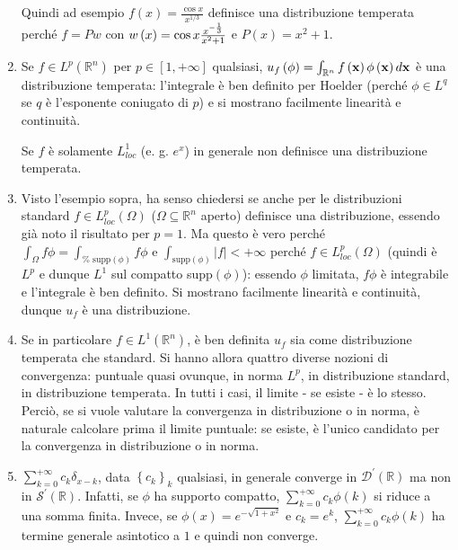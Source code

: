 \documentclass{article}
\begin{document}
\begin{enumerate}
Quindi ad esempio $f\left( x\right) =\frac{\cos x}{x^{1/3}}$ definisce una
distribuzione temperata perch\'{e} $f=Pw$ con $w\left( x\right) =\cos x\frac{%
x^{-\frac{1}{3}}}{x^{2}+1}$ e $P\left( x\right) =x^{2}+1$.

\item Se $f\in L^{p}\left( 
\mathbb{R}
^{n}\right) $ per $p\in \left[ 1,+\infty \right] $ qualsiasi, $u_{f}\left(
\phi \right) =\int_{%
\mathbb{R}
^{n}}f\left( \mathbf{x}\right) \phi \left( \mathbf{x}\right) d\mathbf{x}$ 
\`{e} una distribuzione temperata: l'integrale \`{e} ben definito per
Hoelder (perch\'{e} $\phi \in L^{q}$ se $q$ \`{e} l'esponente coniugato di $%
p $) e si mostrano facilmente linearit\`{a} e continuit\`{a}.

Se $f$ \`{e} solamente $L_{loc}^{1}$ (e. g. $e^{x}$) in generale non
definisce una distribuzione temperata.

\item Visto l'esempio sopra, ha senso chiedersi se anche per le
distribuzioni standard $f\in L_{loc}^{p}\left( \Omega \right) $ ($\Omega
\subseteq 
\mathbb{R}
^{n}$ aperto) definisce una distribuzione, essendo gi\`{a} noto il risultato
per $p=1$. Ma questo \`{e} vero perch\'{e} $\int_{\Omega }f\phi =\int_{\text{%
supp}\left( \phi \right) }f\phi $ e $\int_{\text{supp}\left( \phi \right)
}\left\vert f\right\vert <+\infty $ perch\'{e} $f\in L_{loc}^{p}\left(
\Omega \right) $ (quindi \`{e} $L^{p}$ e dunque $L^{1}$ sul compatto supp$%
\left( \phi \right) $): essendo $\phi $ limitata, $f\phi $ \`{e} integrabile
e l'integrale \`{e} ben definito. Si mostrano facilmente linearit\`{a} e
continuit\`{a}, dunque $u_{f}$ \`{e} una distribuzione.

\item Se in particolare $f\in L^{1}\left( 
\mathbb{R}
^{n}\right) $, \`{e} ben definita $u_{f}$ sia come distribuzione temperata
che standard. Si hanno allora quattro diverse nozioni di convergenza:
puntuale quasi ovunque, in norma $L^{p}$, in distribuzione standard, in
distribuzione temperata. In tutti i casi, il limite - se esiste - \`{e} lo
stesso. Perci\`{o}, se si vuole valutare la convergenza in distribuzione o
in norma, \`{e} naturale calcolare prima il limite puntuale: se esiste, \`{e}
l'unico candidato per la convergenza in distribuzione o in norma.

\item $\sum_{k=0}^{+\infty }c_{k}\delta _{x-k}$, data $\left\{ c_{k}\right\}
_{k}$ qualsiasi, in generale converge in $\mathcal{D}^{\prime }\left( 
\mathbb{R}
\right) $ ma non in $\mathcal{S}^{\prime }\left( 
\mathbb{R}
\right) $. Infatti, se $\phi $ ha supporto compatto, $\sum_{k=0}^{+\infty
}c_{k}\phi \left( k\right) $ si riduce a una somma finita. Invece, se $\phi
\left( x\right) =e^{-\sqrt{1+x^{2}}}$ e $c_{k}=e^{k}$, $\sum_{k=0}^{+\infty
}c_{k}\phi \left( k\right) $ ha termine generale asintotico a $1$ e quindi
non converge.
\end{enumerate}
\end{document}
